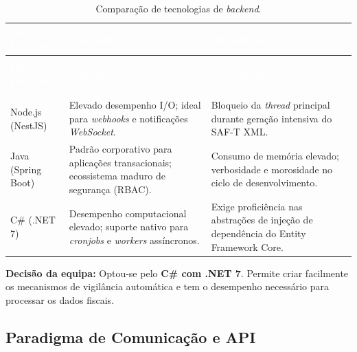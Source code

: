 \begin{center}
{\small
{}
\begin{xltabular}{\textwidth}{|>{\raggedright\arraybackslash}p{3.5cm}|>{\raggedright\arraybackslash}X|>{\raggedright\arraybackslash}X|}
\hline
{}\textcolor{white}{\textbf{Opção Backend}} & \textcolor{white}{\textbf{Vantagens}} & \textcolor{white}{\textbf{Desvantagens}} \\ \hline
\endfirsthead

 \\
\hline
{}\textcolor{white}{\textbf{Opção Backend}} & \textcolor{white}{\textbf{Vantagens}} & \textcolor{white}{\textbf{Desvantagens}} \\ \hline
\endhead

\hline {} \\ \hline \endfoot

\hline
\caption{Comparação de tecnologias de \textit{backend}.}
\label{tab:comparacao_backend} \\
\endlastfoot

Node.js (NestJS) & Elevado desempenho I/O; ideal para \textit{webhooks} e notificações \textit{WebSocket}. & Bloqueio da \textit{thread} principal durante geração intensiva do SAF-T XML. \\ \hline
Java (Spring Boot) & Padrão corporativo para aplicações transacionais; ecossistema maduro de segurança (RBAC). & Consumo de memória elevado; verbosidade e morosidade no ciclo de desenvolvimento. \\ \hline
C\# (.NET 7) & Desempenho computacional elevado; suporte nativo para \textit{cronjobs} e \textit{workers} assíncronos. & Exige proficiência nas abstrações de injeção de dependência do Entity Framework Core. \\ \hline
\end{xltabular}
}
\end{center}

\textbf{Decisão da equipa:} Optou-se pelo \textbf{C\# com .NET 7}. Permite criar facilmente os mecanismos de vigilância automática e tem o desempenho necessário para processar os dados fiscais.

\subsection{Paradigma de Comunicação e API}

